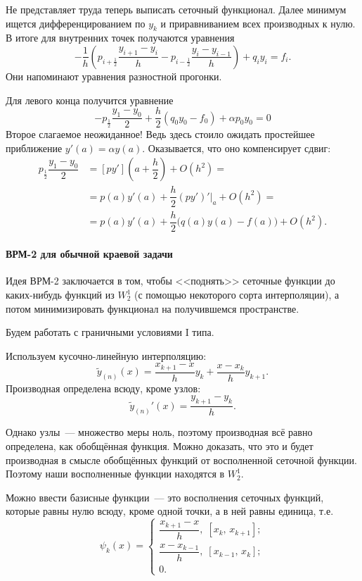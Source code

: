 \documentclass{trlnotes}
\begin{document}
    Не представляет труда теперь выписать сеточный функционал. Далее минимум ищется дифференцированием по $y_k$ и приравниванием всех производных к нулю. В итоге для внутренних точек получаются уравнения
    \[
        -\dfrac{1}{h}\left(p_{i + \tfrac{1}{2}} \dfrac{y_{i + 1} - y_i}{h} - p_{i - \tfrac{1}{2}} \dfrac{y_i - y_{i - 1}}{h}\right) + q_i y_i = f_i.
    \]
    Они напоминают уравнения разностной прогонки.

    Для левого конца получится уравнение
    \[
        -p_{\frac{1}{2}} \dfrac{y_1 - y_0}{2} + \dfrac{h}{2}(q_0 y_0 - f_0) + \alpha p_0 y_0 = 0
    \]
    Второе слагаемое неожиданное! Ведь здесь стоило ожидать простейшее приближение $y'(a) = \alpha y(a)$. Оказывается, что оно компенсирует сдвиг:
    \begin{align*}
        p_{\frac{1}{2}} \dfrac{y_1 - y_0}{2} &= [py']\left(a + \dfrac{h}{2}\right) + O(h^2)  = \\ &= p(a)y'(a) + \dfrac{h}{2}(py')'|_a + O(h^2) = \\ &= p(a)y'(a) + \dfrac{h}{2} \big(q(a)y(a) - f(a)\big) + O(h^2). 
    \end{align*}

    \paragraph{ВРМ-2 для обычной краевой задачи}

    Идея ВРМ-2 заключается в том, чтобы <<поднять>> сеточные функции до каких-нибудь функций из $W_2^1$  (с помощью некоторого сорта интерполяции), а потом минимизировать функционал на получившемся пространстве. 

    Будем работать с граничными условиями I типа.

    Используем кусочно-линейную интерполяцию:
    \[
        \tilde{y}_{(n)}(x) = \dfrac{x_{k + 1} - x}{h} y_k + \dfrac{x - x_k}{h}y_{k + 1}.
    \]
    Производная определена всюду, кроме узлов:
    \[
        \tilde{y}_{(n)}'(x) = \dfrac{y_{k + 1} - y_k}{h}.
    \]

    Однако узлы~--- множество меры ноль, поэтому производная всё равно определена, как обобщённая функция. Можно доказать, что это и будет производная в смысле обобщённых функций от восполненной сеточной функции. Поэтому наши восполненные функции находятся в $W_2^1$.

    Можно ввести базисные функции~--- это восполнения сеточных функций, которые равны нулю всюду, кроме одной точки, а в ней равны единица, т.е.
    \[
        \psi_k(x) = \begin{cases}
            \dfrac{x_{k + 1} - x}{h}, \; [x_k, \, x_{k + 1}]; \\ 
            \dfrac{x - x_{k - 1}}{h}, \; [x_{k - 1}, \, x_k]; \\
            0.
        \end{cases}
    \]
\end{document}
